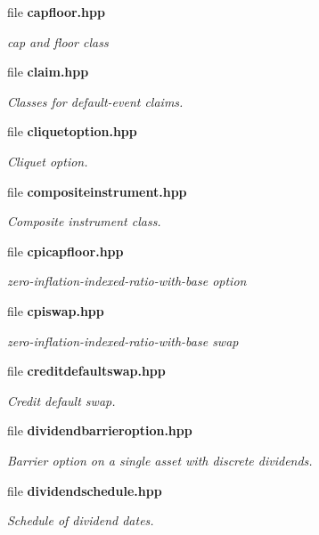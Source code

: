 \begin{DoxyCompactItemize}
file {\bf capfloor.\+hpp}
\begin{DoxyCompactList}\small\item\em cap and floor class \end{DoxyCompactList}\item 
file {\bf claim.\+hpp}
\begin{DoxyCompactList}\small\item\em Classes for default-\/event claims. \end{DoxyCompactList}\item 
file {\bf cliquetoption.\+hpp}
\begin{DoxyCompactList}\small\item\em Cliquet option. \end{DoxyCompactList}\item 
file {\bf compositeinstrument.\+hpp}
\begin{DoxyCompactList}\small\item\em Composite instrument class. \end{DoxyCompactList}\item 
file {\bf cpicapfloor.\+hpp}
\begin{DoxyCompactList}\small\item\em zero-\/inflation-\/indexed-\/ratio-\/with-\/base option \end{DoxyCompactList}\item 
file {\bf cpiswap.\+hpp}
\begin{DoxyCompactList}\small\item\em zero-\/inflation-\/indexed-\/ratio-\/with-\/base swap \end{DoxyCompactList}\item 
file {\bf creditdefaultswap.\+hpp}
\begin{DoxyCompactList}\small\item\em Credit default swap. \end{DoxyCompactList}\item 
file {\bf dividendbarrieroption.\+hpp}
\begin{DoxyCompactList}\small\item\em Barrier option on a single asset with discrete dividends. \end{DoxyCompactList}\item 
file {\bf dividendschedule.\+hpp}
\begin{DoxyCompactList}\small\item\em Schedule of dividend dates. \end{DoxyCompactList}\item 

\end{DoxyCompactItemize}
